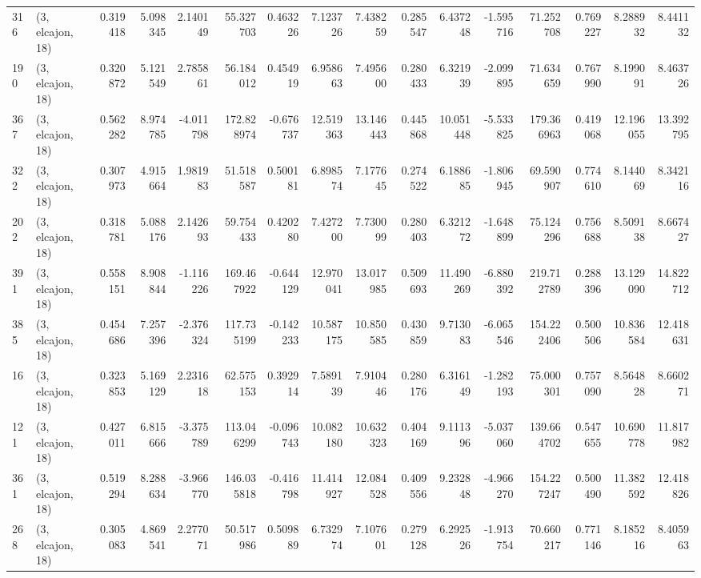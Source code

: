 \begin{tabular}{llrrrrrrrrrrrrrr}
316 &  (3, elcajon, 18) &   0.319418 &   5.098345 &   2.140149 &    55.327703 &   0.463226 &   7.123726 &   7.438259 &  0.285547 &   6.437248 &  -1.595716 &    71.252708 &   0.769227 &   8.288932 &   8.441132 \\
190 &  (3, elcajon, 18) &   0.320872 &   5.121549 &   2.785861 &    56.184012 &   0.454919 &   6.958663 &   7.495600 &  0.280433 &   6.321939 &  -2.099895 &    71.634659 &   0.767990 &   8.199091 &   8.463726 \\
367 &  (3, elcajon, 18) &   0.562282 &   8.974785 &  -4.011798 &   172.828974 &  -0.676737 &  12.519363 &  13.146443 &  0.445868 &  10.051448 &  -5.533825 &   179.366963 &   0.419068 &  12.196055 &  13.392795 \\
322 &  (3, elcajon, 18) &   0.307973 &   4.915664 &   1.981983 &    51.518587 &   0.500181 &   6.898574 &   7.177645 &  0.274522 &   6.188685 &  -1.806945 &    69.590907 &   0.774610 &   8.144069 &   8.342116 \\
202 &  (3, elcajon, 18) &   0.318781 &   5.088176 &   2.142693 &    59.754433 &   0.420280 &   7.427200 &   7.730099 &  0.280403 &   6.321272 &  -1.648899 &    75.124296 &   0.756688 &   8.509138 &   8.667427 \\
391 &  (3, elcajon, 18) &   0.558151 &   8.908844 &  -1.116226 &   169.467922 &  -0.644129 &  12.970041 &  13.017985 &  0.509693 &  11.490269 &  -6.880392 &   219.712789 &   0.288396 &  13.129090 &  14.822712 \\
385 &  (3, elcajon, 18) &   0.454686 &   7.257396 &  -2.376324 &   117.735199 &  -0.142233 &  10.587175 &  10.850585 &  0.430859 &   9.713083 &  -6.065546 &   154.222406 &   0.500506 &  10.836584 &  12.418631 \\
16  &  (3, elcajon, 18) &   0.323853 &   5.169129 &   2.231618 &    62.575153 &   0.392914 &   7.589139 &   7.910446 &  0.280176 &   6.316149 &  -1.282193 &    75.000301 &   0.757090 &   8.564828 &   8.660271 \\
121 &  (3, elcajon, 18) &   0.427011 &   6.815666 &  -3.375789 &   113.046299 &  -0.096743 &  10.082180 &  10.632323 &  0.404169 &   9.111396 &  -5.037060 &   139.664702 &   0.547655 &  10.690778 &  11.817982 \\
361 &  (3, elcajon, 18) &   0.519294 &   8.288634 &  -3.966770 &   146.035818 &  -0.416798 &  11.414927 &  12.084528 &  0.409556 &   9.232848 &  -4.966270 &   154.227247 &   0.500490 &  11.382592 &  12.418826 \\
268 &  (3, elcajon, 18) &   0.305083 &   4.869541 &   2.277071 &    50.517986 &   0.509889 &   6.732974 &   7.107601 &  0.279128 &   6.292526 &  -1.913754 &    70.660217 &   0.771146 &   8.185216 &   8.405963 \\

\end{tabular}
